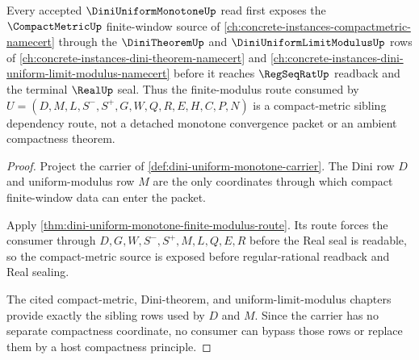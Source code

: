\begin{theorem}\label{thm:dini-uniform-monotone-compact-metric-route}
Every accepted $\DiniUniformMonotoneUp$ read first exposes the $\CompactMetricUp$ finite-window source of \autoref{ch:concrete-instances-compactmetric-namecert} through the $\DiniTheoremUp$ and $\DiniUniformLimitModulusUp$ rows of \autoref{ch:concrete-instances-dini-theorem-namecert} and \autoref{ch:concrete-instances-dini-uniform-limit-modulus-namecert} before it reaches $\RegSeqRatUp$ readback and the terminal $\RealUp$ seal. Thus the finite-modulus route consumed by $U=(D,M,L,S^{-},S^{+},G,W,Q,R,E,H,C,P,N)$ is a compact-metric sibling dependency route, not a detached monotone convergence packet or an ambient compactness theorem.
\end{theorem}
\begin{proof}
Project the carrier of \autoref{def:dini-uniform-monotone-carrier}. The Dini row $D$ and uniform-modulus row $M$ are the only coordinates through which compact finite-window data can enter the packet.

Apply \autoref{thm:dini-uniform-monotone-finite-modulus-route}. Its route forces the consumer through $D,G,W,S^{-},S^{+},M,L,Q,E,R$ before the Real seal is readable, so the compact-metric source is exposed before regular-rational readback and Real sealing.

The cited compact-metric, Dini-theorem, and uniform-limit-modulus chapters provide exactly the sibling rows used by $D$ and $M$. Since the carrier has no separate compactness coordinate, no consumer can bypass those rows or replace them by a host compactness principle.
\end{proof}


